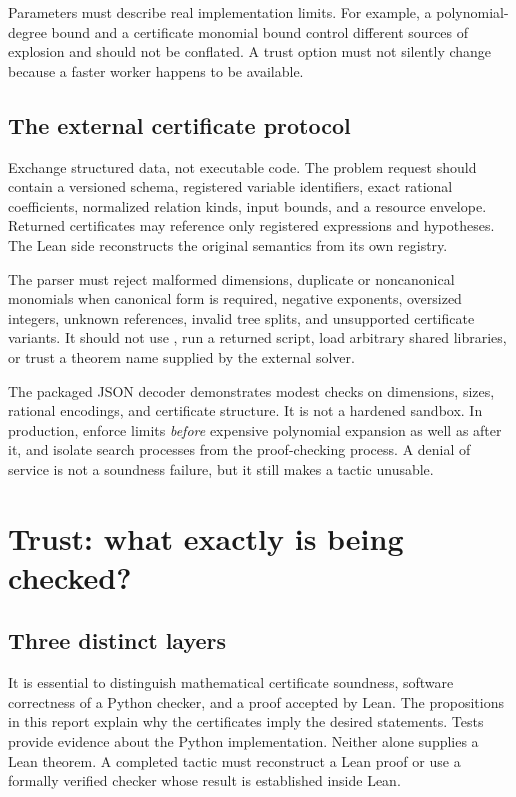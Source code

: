 Parameters must describe real implementation limits. For example, a polynomial-degree bound and a certificate monomial bound control different sources of explosion and should not be conflated. A trust option must not silently change because a faster worker happens to be available.

\subsection{The external certificate protocol}

Exchange structured data, not executable code. The problem request should contain a versioned schema, registered variable identifiers, exact rational coefficients, normalized relation kinds, input bounds, and a resource envelope. Returned certificates may reference only registered expressions and hypotheses. The Lean side reconstructs the original semantics from its own registry.

The parser must reject malformed dimensions, duplicate or noncanonical monomials when canonical form is required, negative exponents, oversized integers, unknown references, invalid tree splits, and unsupported certificate variants. It should not use , run a returned script, load arbitrary shared libraries, or trust a theorem name supplied by the external solver.

The packaged JSON decoder demonstrates modest checks on dimensions, sizes, rational encodings, and certificate structure. It is not a hardened sandbox. In production, enforce limits \emph{before} expensive polynomial expansion as well as after it, and isolate search processes from the proof-checking process. A denial of service is not a soundness failure, but it still makes a tactic unusable.

\section{Trust: what exactly is being checked?}

\subsection{Three distinct layers}

It is essential to distinguish mathematical certificate soundness, software correctness of a Python checker, and a proof accepted by Lean. The propositions in this report explain why the certificates imply the desired statements. Tests provide evidence about the Python implementation. Neither alone supplies a Lean theorem. A completed tactic must reconstruct a Lean proof or use a formally verified checker whose result is established inside Lean.

